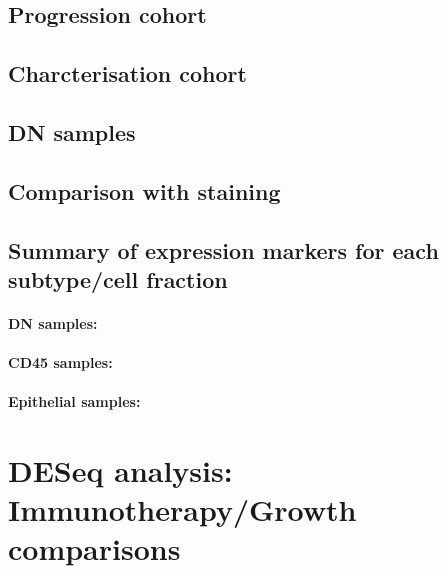 \documentclass[
]{book}
\begin{document}
\hypertarget{progression-cohort}{%
\section{Progression cohort}\label{progression-cohort}}

\hypertarget{charcterisation-cohort}{%
\section{Charcterisation cohort}\label{charcterisation-cohort}}

\hypertarget{dn-samples}{%
\section{DN samples}\label{dn-samples}}

\hypertarget{comparison-with-staining}{%
\section{Comparison with staining}\label{comparison-with-staining}}

\hypertarget{summary-of-expression-markers-for-each-subtypecell-fraction}{%
\section{Summary of expression markers for each subtype/cell fraction}\label{summary-of-expression-markers-for-each-subtypecell-fraction}}

\hypertarget{dn-samples-1}{%
\subsubsection{DN samples:}\label{dn-samples-1}}

\hypertarget{cd45-samples}{%
\subsubsection{CD45 samples:}\label{cd45-samples}}

\hypertarget{epithelial-samples}{%
\subsubsection{Epithelial samples:}\label{epithelial-samples}}

\hypertarget{deseq-analysis-immunotherapygrowth-comparisons}{%
\chapter{DESeq analysis: Immunotherapy/Growth comparisons}\label{deseq-analysis-immunotherapygrowth-comparisons}}
\end{document}
